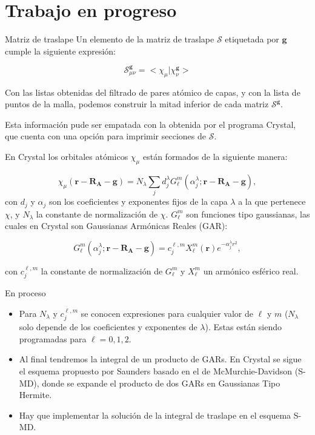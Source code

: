 \documentclass[dvisvgm,11pt,aspectratio=169]{beamer}
\begin{document}
\section{Trabajo en progreso}
\begin{frame}{Matriz de traslape}
Un elemento de la matriz de traslape $\bm{\mathcal{S}}$ etiquetada por $\mathbf{g}$ cumple la siguiente expresión:

\begin{equation}
\mathcal{S}^\mathbf{g}_{\mu\nu} = <\chi_\mu|\chi_\nu^\mathbf{g}>    
\end{equation}

Con las listas obtenidas del filtrado de pares atómico de capas, y con la lista de puntos de la malla, podemos construir la mitad inferior de cada matriz $\bm{\mathcal{S}}^{\mathbf{g}}$. 

Esta información pude ser empatada con la obtenida por el programa Crystal, que cuenta con una opción para imprimir secciones de $\bm{\mathcal{S}}$. 

\end{frame}

\begin{frame}
En Crystal los orbitales atómicos $\chi_\mu$ están formados de la siguiente manera:

\begin{equation}\label{aoInRSG}
\chi_{\mu}(\mathbf{r-R_A-g}) = N_\lambda \sum_j d_j^\lambda G_{\ell}^m (\alpha_j^\lambda;\mathbf{r-R_A-g}),
\end{equation}
con $d_j$ y $\alpha_j$ son los coeficientes y exponentes fijos de la capa $\lambda$ a la que pertenece $\chi$, y $N_\lambda$ la constante de normalización de $\chi$. $G_{\ell}^m$ son funciones tipo gaussianas, las cuales en Crystal son Gaussianas Armónicas Reales (GAR):

\begin{equation}
G_{\ell}^m (\alpha_j^\lambda;\mathbf{r-R_A-g}) = c_j^{\ell,m} X_\ell^m(\mathbf{r}) e^{-\alpha_j^\lambda r^2},
\end{equation}

con $c_j^{\ell,m}$ la constante de normalización de $G_{\ell}^m$ y $X_\ell^m$ un armónico esférico real. 

\end{frame}

\begin{frame}{En proceso}
\begin{itemize}
\item Para $N_\lambda$ y $c_j^{\ell,m}$ se conocen expresiones para cualquier valor de $\ell$ y $m$ ($N_\lambda$ solo depende de los coeficientes y exponentes de $\lambda$). Estas están siendo programadas para $\ell=0,1,2$.
\item Al final tendremos la integral de un producto de GARs. En Crystal se sigue el esquema propuesto por Saunders basado en el de McMurchie-Davidson (S-MD), donde se expande el producto de dos GARs en Gaussianas Tipo Hermite.
\item Hay que implementar la solución de la integral de traslape en el esquema S-MD.
\end{itemize}
\end{frame}
\end{document}
